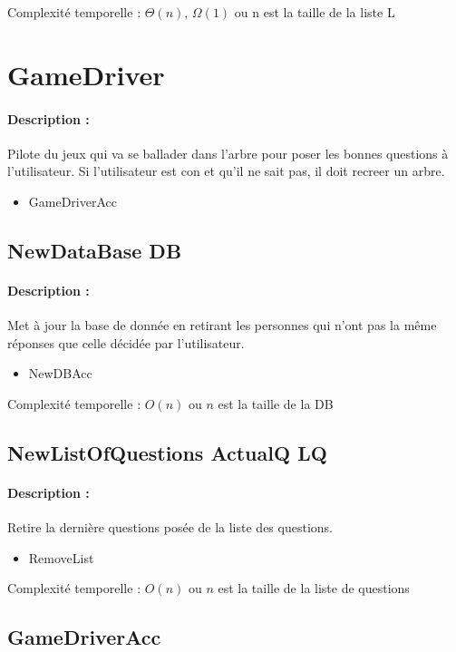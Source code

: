 \documentclass[10pt,a4paper]{article}
\begin{document}
Complexité temporelle : $\Theta(n)$, $\Omega(1)$ ou n est la taille de la liste L

\section{GameDriver}
\paragraph{Description :} Pilote du jeux qui va se ballader dans l'arbre pour poser les bonnes questions à l'utilisateur. Si l'utilisateur est con et qu'il ne sait pas, il doit recreer un arbre.

\begin{itemize}
\item GameDriverAcc
\end{itemize}

\subsection{NewDataBase DB}
\paragraph{Description :} Met à jour la base de donnée en retirant les personnes qui n'ont pas la même réponses que celle décidée par l'utilisateur.

\begin{itemize}
\item NewDBAcc
\end{itemize}

Complexité temporelle : $O(n)$ ou $n$ est la taille de la DB

\subsection{NewListOfQuestions ActualQ LQ}
\paragraph{Description :} Retire la dernière questions posée de la liste des questions.

\begin{itemize}
\item RemoveList
\end{itemize}

Complexité temporelle : $O(n)$ ou $n$ est la taille de la liste de questions

\subsection{GameDriverAcc}
\end{document}
